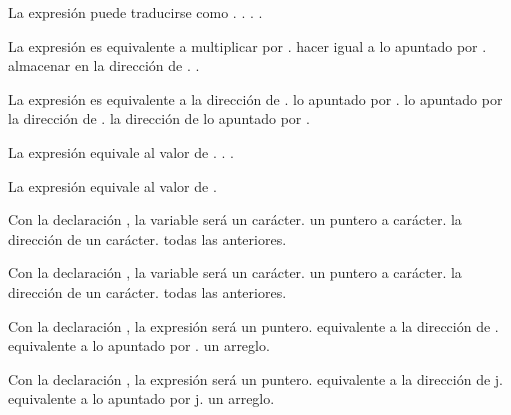 
\question La expresión  puede traducirse como
\choice {}.
\correctchoice {}.
\choice {}.
\choice {}
\choice {}.

\question La expresión  es equivalente a
\choice multiplicar  por .
\correctchoice hacer  igual a lo apuntado por .
\choice almacenar en  la dirección de .
\choice {}.

\question La expresión  es equivalente a
\choice la dirección de .
\choice lo apuntado por .
\choice lo apuntado por la dirección de .
\correctchoice la dirección de lo apuntado por .

\question La expresión  equivale al valor de 
\choice {}.
\choice {}
\correctchoice {}.
\choice {}.

\question La expresión  equivale al valor de 
\choice {}
\choice {}
\correctchoice {}
\choice {}.

\question Con la declaración , la variable  será
\choice un carácter.
\correctchoice un puntero a carácter.
\choice la dirección de un carácter.
\choice todas las anteriores.

\question Con la declaración , la variable  será
\correctchoice un carácter. 
\choice un puntero a carácter.
\choice la dirección de un carácter.
\choice todas las anteriores.

\question Con la declaración , la expresión  será
\choice un puntero.
\correctchoice equivalente a la dirección de .
\choice equivalente a lo apuntado por .
\choice un arreglo.

\question Con la declaración , la expresión  será
\choice un puntero.
\choice equivalente a la dirección de j.
\correctchoice equivalente a lo apuntado por j.
\choice un arreglo.

